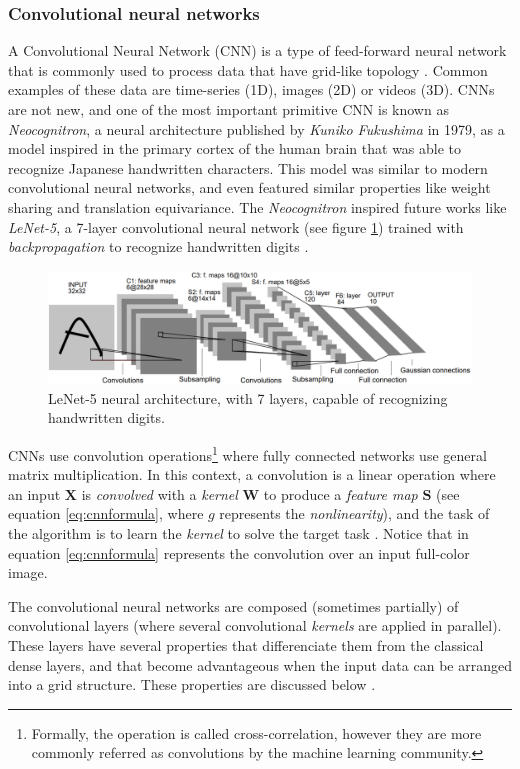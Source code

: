 \subsubsection{Convolutional neural networks}
A Convolutional Neural Network (CNN) is a type of feed-forward neural network that is commonly used to process data that have grid-like topology \cite{Goodfellow2016}. Common examples of these data are time-series (1D), images (2D) or videos (3D). CNNs are not new, and one of the most important primitive CNN is known as \textit{Neocognitron}, a neural architecture published by \textit{Kuniko Fukushima} \cite{fukushima1980} in 1979, as a model inspired in the primary cortex of the human brain that was able to recognize Japanese handwritten characters. This model was similar to modern convolutional neural networks, and even featured similar properties like weight sharing and translation equivariance. The \textit{Neocognitron} inspired future works like \textit{LeNet-5}, a 7-layer convolutional neural network (see figure \ref{fig:lenet5}) trained with \textit{backpropagation} to recognize handwritten digits \cite{lecun1998}. 

\begin{figure}
	\centering
	\includegraphics[width=0.7\linewidth]{chapter2/images/lenet5}
	\caption{LeNet-5 neural architecture, with 7 layers, capable of recognizing handwritten digits.}
	\label{fig:lenet5}
\end{figure}

CNNs use convolution operations\footnote{Formally, the operation is called cross-correlation, however they are more commonly referred as convolutions by the machine learning community.} where fully connected networks use general matrix multiplication. In this context, a convolution is a linear operation where an input $\mathbf{X}$ is \textit{convolved} with a \textit{kernel} $\mathbf{W}$ to produce a \textit{feature map} $\mathbf{S}$ (see equation \ref{eq:cnnformula}, where $g$ represents the \textit{nonlinearity}), and the task of the algorithm is to learn the \textit{kernel} to solve the target task \cite{haykin1998}. Notice that in equation \ref{eq:cnnformula} represents the convolution over an input full-color image.

The convolutional neural networks are composed (sometimes partially) of convolutional layers (where several convolutional \textit{kernels} are applied in parallel). These layers have several properties that differenciate them from the classical dense layers, and that become advantageous when the input data can be arranged into a grid structure. These properties are discussed below \cite{Goodfellow2016}.

